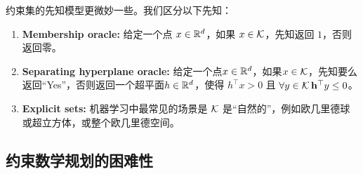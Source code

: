 约束集的先知模型更微妙一些。我们区分以下先知：
\begin{enumerate}
\item
{\bf Membership oracle: }
给定一个点 $x \in {\mathbb R}^d$，如果 $x \in \mathcal K$，先知返回 $1$，否则返回零。
\item
{\bf Separating hyperplane oracle: }
给定一个点$x \in {\mathbb R}^d$，如果$x\in\mathcal K$，先知要么返回“Yes”，否则返回一个超平面$h \in {\mathbb R}^d$，使得 $h^\top x>0$ 且 $\forall y\in\mathcal K\, \mathbf h^\top y\leq 0$。
\item
{\bf Explicit sets: } 
机器学习中最常见的场景是 $\mathcal K$ 是“自然的”，例如欧几里德球或超立方体，或整个欧几里德空间。
\end{enumerate}



\subsection{
    约束数学规划的困难性
    }

